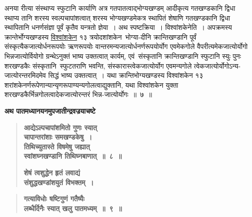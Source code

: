 \documentclass[11pt, openany]{book}
\begin{document}
\begin{sloppypar}
\noindent अनया रीत्या संस्थाप्य स्फुटानि कार्याणि अत्र गतपातत्वाद्भोग्यखण्डम् आदीकृत्य गतखण्डकानि द्विधा स्थाप्य तानि शरस्य स्वल्पचापांशत्वात् शरस्य भोग्यखण्डमेकत्र स्थापितं शेषाणि गतखण्डकानि द्विधा स्थापितानि धनर्णसंज्ञा पूर्वं कृतैव यन्त्रतो ज्ञेया~। अथ स्पष्टक्रिया~। विश्वांशकेनेति~। अपक्रमस्य क्रान्तेर्भोग्यखण्डस्य \hyperref[9.7]{विश्वांशकेन} १३ त्रयोदशांशकेन~भोग्या-दीनि क्रान्तिखण्डानि पूर्वं संस्कृत्यैकजात्योर्धनरूपयोः ऋणरूपयोः वान्तरमन्यजात्योर्धनर्णरूपयोर्योग एवमेकगोले वैपरीत्यमेकजात्योर्योगो भिन्नजात्योर्वियोगो ग्रन्थेऽनुक्तं भाष्य उक्तत्वात् कार्यम्, एवं~संस्कृतानि क्रान्तिखण्डानि स्फुटानि स्युः पुनः शरखण्डकैः संस्कृतानि~स्फुटतराणि भवन्ति, संस्कारास्त्वेकजात्योर्योग एवमन्यगोले त्वेकजात्योर्योगोऽन्य-जात्योरन्तरमिदमेव सिद्धं भाष्य उक्तत्वात्~। यथा क्रान्तिभोग्यखण्डस्य विश्वांशकेन १३ शरांशकेनर्णरूपेणान्यान्यृणरूपाण्यन्यगोलत्वाद्युक्तानि, यथा विश्वांशकेन युक्ता शरखण्डकैर्भिन्नगोलत्वादेकजात्योरन्तरं भिन्न-जात्योर्योगः~॥~७~॥\\
\end{sloppypar}

{\small \textbf{अथ पातमध्यानयनमुपजातीन्द्रवज्रयाचष्टे\textendash }}

 \label{9.8}
\begin{quote}
{\large \textbf{{\color{purple}आद्येऽल्पचापांशमितो गुणः स्यात् \\ चापान्तरांशाः समखण्डकेषु~। \\
तिथिच्युतास्ते विषमेषु जह्यात् \\
स्वांशघ्नखण्डानि तिथिघ्नबाणात्~॥~८~॥}}
\vspace{1mm}

 \label{9.9.1}
\textbf{{\color{purple}शेषं त्वशुद्धेन हृतं लवाद्यं \\
संशुद्धखण्डांशयुतं विभक्तम्~।}}}
\end{quote}

\newpage

 \label{9.9}
\begin{quote}
{\large \textbf{{\color{purple}गत्याविधोः षष्टिगुणं गतैष्यैः \\
लब्धैर्दिनैः स्यात् खलु पातमध्यम्~॥~९~॥}}}
\end{quote}
\end{document}
